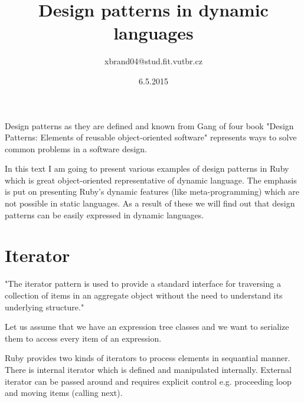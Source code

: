 \documentclass[a4paper,10pt]{article}
\title{Design patterns in dynamic languages}
\author{xbrand04@stud.fit.vutbr.cz}
\date{6.5.2015}
\begin{document}
\maketitle

Design patterns as they are defined and known from Gang of four book "Design Patterns: Elements of
reusable object-oriented software" represents ways to solve common problems in a software design.

In this text I am going to present various examples of design patterns in Ruby which
is great object-oriented representative of dynamic language. The emphasis is put on presenting
Ruby's dynamic features (like meta-programming) which are not possible in static languages. As a
result of these we will find out that design patterns can be easily expressed in dynamic languages.


\section{Iterator}
"The iterator pattern is used to provide a standard interface for traversing a collection of items
in an aggregate object without the need to understand its underlying structure."

Let us assume that we have an expression tree classes and we want to serialize them to access every
item of an expression.

Ruby provides two kinds of iterators to process elements in sequantial manner. There is internal
iterator which is defined and manipulated internally. External iterator can be passed around and
requires explicit control e.g. proceeding loop and moving items (calling next).



\end{document}
